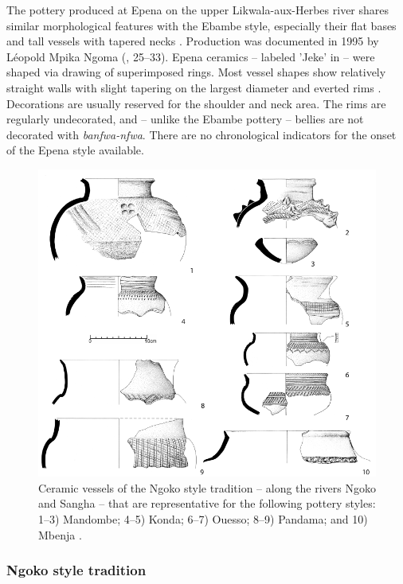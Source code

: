 \documentclass[smallextended,natbib]{svjour3}       %
\begin{document}
The pottery produced at Epena on the upper Likwala-aux-Herbes river shares similar morphological features with the Ebambe style, especially their flat bases and tall vessels with tapered necks \citep[Fig.~\ref{fig:sangha}.16--17;][137--141]{Seidensticker.2021e}. Production was documented in 1995 by Léopold Mpika Ngoma (\citeyear{MpikaNgoma.1996}, 25--33). Epena ceramics -- labeled 'Jeke' in \citet[119 Fig.~6.3]{Seidensticker.2016b} -- were shaped via drawing of superimposed rings. Most vessel shapes show relatively straight walls with slight tapering on the largest diameter and everted rims \citep[138 Fig.~60]{Seidensticker.2021e}. Decorations are usually reserved for the shoulder and neck area. The rims are regularly undecorated, and -- unlike the Ebambe pottery -- bellies are not decorated with \textit{banfwa-nfwa}. There are no chronological indicators for the onset of the Epena style available.

\begin{figure}[!tb]
	\centering
	\includegraphics[width=.6\textwidth]{Ngoko-Trad_Typen.pdf}
	\caption{Ceramic vessels of the Ngoko style tradition -- along the rivers Ngoko and Sangha -- that are representative for the following pottery styles: 1--3) Mandombe; 4--5) Konda; 6--7) Ouesso; 8--9) Pandama; and 10) Mbenja \citep[145--162]{Seidensticker.2021e}.}
	\label{fig:ngoko}
\end{figure}

\subsubsection*{Ngoko style tradition}
\end{document}

